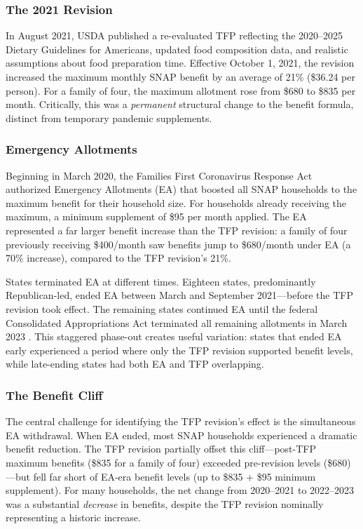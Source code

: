 \documentclass[12pt]{article}
\begin{document}
\subsubsection*{The 2021 Revision} In August 2021, USDA published a re-evaluated TFP reflecting the 2020--2025 Dietary Guidelines for Americans, updated food composition data, and realistic assumptions about food preparation time. Effective October 1, 2021, the revision increased the maximum monthly SNAP benefit by an average of 21\% (\$36.24 per person). For a family of four, the maximum allotment rose from \$680 to \$835 per month. Critically, this was a \emph{permanent} structural change to the benefit formula, distinct from temporary pandemic supplements.

\subsubsection*{Emergency Allotments} Beginning in March 2020, the Families First Coronavirus Response Act authorized Emergency Allotments (EA) that boosted all SNAP households to the maximum benefit for their household size. For households already receiving the maximum, a minimum supplement of \$95 per month applied. The EA represented a far larger benefit increase than the TFP revision: a family of four previously receiving \$400/month saw benefits jump to \$680/month under EA (a 70\% increase), compared to the TFP revision's 21\%.

States terminated EA at different times. Eighteen states, predominantly Republican-led, ended EA between March and September 2021---before the TFP revision took effect. The remaining states continued EA until the federal Consolidated Appropriations Act terminated all remaining allotments in March 2023 \citep{rosenbaum2023}. This staggered phase-out creates useful variation: states that ended EA early experienced a period where only the TFP revision supported benefit levels, while late-ending states had both EA and TFP overlapping.

\subsubsection*{The Benefit Cliff} The central challenge for identifying the TFP revision's effect is the simultaneous EA withdrawal. When EA ended, most SNAP households experienced a dramatic benefit reduction. The TFP revision partially offset this cliff---post-TFP maximum benefits (\$835 for a family of four) exceeded pre-revision levels (\$680)---but fell far short of EA-era benefit levels (up to \$835 + \$95 minimum supplement). For many households, the net change from 2020--2021 to 2022--2023 was a substantial \emph{decrease} in benefits, despite the TFP revision nominally representing a historic increase.
\end{document}
